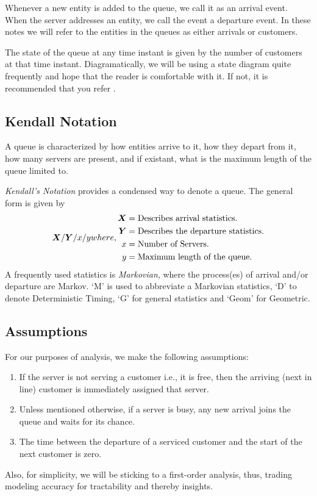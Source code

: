 \documentclass[11pt, a4paper]{report}
\begin{document}
Whenever a new entity is added to the queue, we call it as an arrival event. When the server addresses an entity, we call the event a departure event. In these notes we will refer to the entities in the queues as either arrivals or customers.

The state of the queue at any time instant is given by the number of customers at that time instant. Diagramatically, we will be using a state diagram quite frequently and hope that the reader is comfortable with it. If not, it is recommended that you refer \cite{pishro2014introduction}. 

\subsection{Kendall Notation}
A queue is characterized by how entities arrive to it, how they depart from it, how many servers are present, and if existant, what is the maximum length of the queue limited to.

\emph{Kendall's Notation} provides a condensed way to denote a queue. The general form is given by 
\begin{subequations}
    \begin{align}
        \mX / \mY / x / y 
    \end{align}
    where, 
    \begin{align*}
        \mX &= \text{Describes arrival statistics.}\\
        \mY &= \text{Describes the departure statistics.} \\
        x &= \text{Number of Servers.}\\
        y &= \text{Maximum length of the queue.} 
    \end{align*}
\end{subequations}
A frequently used statistics is \emph{Markovian}, where the process(es) of arrival and/or departure are Markov. `M' is used to abbreviate a Markovian statistics, `D' to denote Deterministic Timing, `G' for general statistics and `Geom' for Geometric. 

\subsection{Assumptions}

For our purposes of analysis, we make the following assumptions:
\begin{enumerate}
    \item If the server is not serving a customer i.e., it is free, then the arriving (next in line) customer is immediately assigned that server.
    \item Unless mentioned otherwise, if a server is busy, any new arrival joins the queue and waits for its chance.
    \item The time between the departure of a serviced customer and the start of the next customer is zero.
\end{enumerate}
Also, for simplicity, we will be sticking to a first-order analysis, thus, trading modeling accuracy for tractability and thereby insights.
\end{document}
